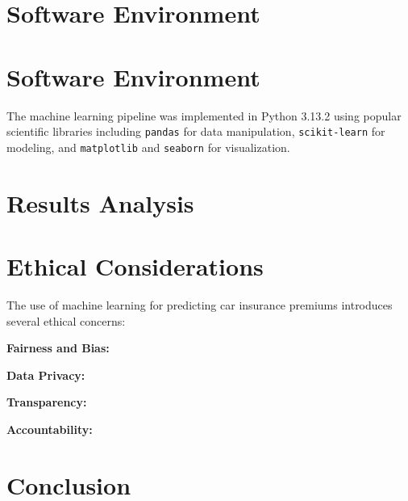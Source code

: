 \documentclass{article}
\begin{document}
\newpage
\section{Software Environment}


\section{Software Environment}

The machine learning pipeline was implemented in Python 3.13.2 using popular scientific libraries including \texttt{pandas} for data manipulation, \texttt{scikit-learn} for modeling, and \texttt{matplotlib} and \texttt{seaborn} for visualization.



\newpage
\section{Results Analysis}

\newpage
\section{Ethical Considerations}

The use of machine learning for predicting car insurance premiums introduces several ethical concerns:

\textbf{Fairness and Bias:} 

\textbf{Data Privacy:} 

\textbf{Transparency:} 

\textbf{Accountability:} 

\newpage
\section{Conclusion}

\newpage

\printbibliography
\end{document}
